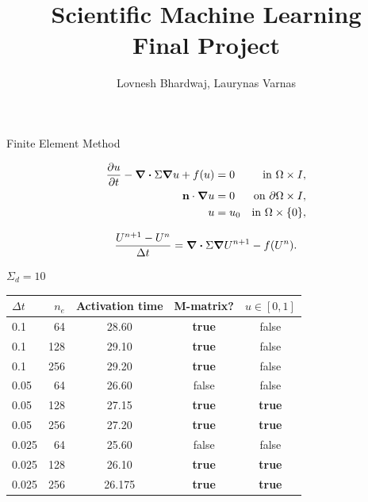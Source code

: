\documentclass[14pt,aspectratio=169]{beamer}
\title{Scientific Machine Learning \\ Final Project}
\author{Lovnesh Bhardwaj, Laurynas Varnas}
\date{}
\begin{document}
\begin{frame}
	\titlepage
\end{frame}

\begin{frame}[plain]
	\centering
	Finite Element Method
\end{frame}

\begin{frame}
	\begin{align*}
		\pdv{u}{t} - \divergence \Sigma \grad u + f(u) & = 0   & \text{in } \Omega \times I,          \\
		\mathbf{n} \cdot \grad u                       & = 0   & \text{on } \partial \Omega \times I, \\
		u                                              & = u_0 & \text{in } \Omega \times \{0\},
	\end{align*}
\end{frame}

\begin{frame}
	\begin{align*}
		\frac{U^{n+1} - U^n}{\Delta t} = \divergence \Sigma \grad U^{n+1} - f(U^n).
	\end{align*}
\end{frame}


\begin{frame}{$\Sigma_d = 10$}
	\begin{table}[H]
		\centering
		\begin{tabular}{l|r|ccc}
			$\Delta t$ & $n_e$ & Activation time & M-matrix?     & $u \in [0, 1]$ \\
			\hline
			0.1        & 64    & 28.60           & \textbf{true} & false          \\
			0.1        & 128   & 29.10           & \textbf{true} & false          \\
			0.1        & 256   & 29.20           & \textbf{true} & false          \\
			0.05       & 64    & 26.60           & false         & false          \\
			0.05       & 128   & 27.15           & \textbf{true} & \textbf{true}  \\
			0.05       & 256   & 27.20           & \textbf{true} & \textbf{true}  \\
			0.025      & 64    & 25.60           & false         & false          \\
			0.025      & 128   & 26.10           & \textbf{true} & \textbf{true}  \\
			0.025      & 256   & 26.175          & \textbf{true} & \textbf{true}  \\
		\end{tabular}
	\end{table}
\end{frame}
\end{document}
